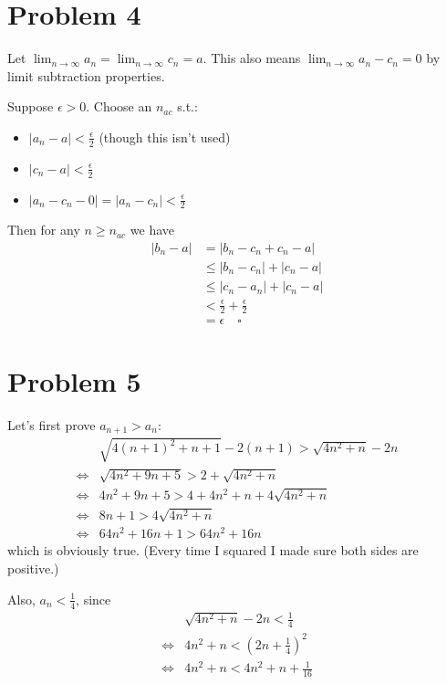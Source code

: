 \documentclass[12pt]{article}
\begin{document}
\section{Problem 4}

Let $\lim_{n \to \infty} a_n=\lim_{n \to \infty} c_n=a$.
This also means $\lim_{n \to \infty} a_n - c_n=0$ by limit subtraction properties.

Suppose $\epsilon > 0$.
Choose an $n_{ac}$ s.t.:
\begin{itemize}[nolistsep]
  \item $|a_n-a| < \frac{\epsilon}{2}$ (though this isn't used)
  \item $|c_n-a| < \frac{\epsilon}{2}$
  \item $|a_n-c_n-0|=|a_n-c_n| < \frac{\epsilon}{2}$
\end{itemize}

Then for any $n \ge n_{ac}$ we have
\begin{align*}
  |b_n-a|
   & = |b_n-c_n+c_n-a|                         \\
   & \le |b_n-c_n|+|c_n-a|                     \\
   & \le |c_n - a_n| + |c_n - a|               \\
   & < \frac{\epsilon}{2} + \frac{\epsilon}{2} \\
   & = \epsilon\quad\square
\end{align*}

\pagebreak

\section{Problem 5}

Let's first prove $a_{n+1} > a_n$:
\begin{align*}
         & \sqrt{4(n+1)^2+n+1}-2(n+1)>\sqrt{4n^2+n}-2n \\
  \iff{} & \sqrt{4n^2+9n+5}>2+\sqrt{4n^2+n}            \\
  \iff{} & 4n^2+9n+5 > 4+4n^2+n+4\sqrt{4n^2+n}         \\
  \iff{} & 8n+1 > 4\sqrt{4n^2+n}                       \\
  \iff{} & 64n^2+16n+1 > 64n^2+16n
\end{align*}
which is obviously true. (Every time I squared I made sure both sides are positive.)

Also, $a_n < \frac{1}{4}$, since
\begin{align*}
         & \sqrt{4n^2+n}-2n<\frac{1}{4}           \\
  \iff{} & 4n^2+n < \left(2n+\frac{1}{4}\right)^2 \\
  \iff{} & 4n^2+n < 4n^2+n+\frac{1}{16}
\end{align*}
\end{document}
